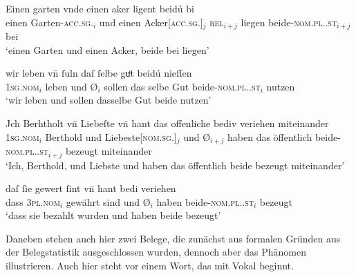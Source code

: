 \begin{exe}
\ex \label{ex:vvfinctrl}
	\begin{xlist}
	\ex \label{ex:vvfinctrl_1}
		\gll Einen garten vnde einen aker {} ligent
			beidú bi \textelp{} \\			
			einen Garten-\textsc{acc.sg.\MascI}$_i$ und einen
				Acker[\textsc{acc.sg.\MascI}]$_j$ \textsc{rel}$_{i+j}$ liegen
				beide-\textsc{nom.pl.\NeutI.st}$_{i+j}$ bei {} \\
		\trans `einen Garten und einen Acker,  beide bei
			\textelp{} liegen'
			\parencites(Nr.~3249, Freiburg i.\,Br., 1299)[417,4--5]{cao4}

	\ex \label{ex:vvfinctrl_2}
		\gll wir leben \textelp{} vn̄ {} ſuln daſ ſelbe guͦt
				beidú nieſſen \\				
			\textsc{1sg\subMF.nom}$_i$ leben {} und Ø$_i$ sollen das selbe Gut
				beide-\textsc{nom.pl.\NeutMF.st}$_i$ nutzen \\
		\trans `wir leben \textelp{} und  sollen
			dasselbe Gut beide nutzen'
			\parencites(Nr.~3376, Neuenburg am Rhein, Kr.~Breisgau-Hochschwarzwald, 1299)[493,21--22]{cao4}

	\ex \label{ex:vvfinctrl_3}
		\gll Jch Berhtholt vn̄ Liebeſte \textelp{} vn̄
				{} hant das offenliche bediv veriehen
				miteinander \\				
			\textsc{1sg\subM.nom}$_i$ Berthold und Liebeste[\textsc{nom.sg.\FemF}]$_j$ {}
				und Ø$_{i+j}$ haben das öffentlich
				beide-\textsc{nom.pl.\NeutMF.st}$_{i+j}$ bezeugt miteinander \\
		\trans `Ich, Berthold, und Liebste \textelp{} und 
			haben das öffentlich beide bezeugt miteinander'
			\parencites(Nr.~N~150, Kl.~Niedermünster, Dépt.~Bas-Rhin, 1277)[108,31--32]{cao5}

	\ex \label{ex:vvfinctrl_4}
		\gll daſ ſie gewert ſint \textelp{} vn̄ {} hant
				bedi veriehen \\				
			dass \textsc{3pl\subMF.nom}$_i$ gewährt sind {} und Ø$_i$ haben
				beide-\textsc{nom.pl.\NeutMF.st}$_i$ bezeugt \\
		\trans `dass sie bezahlt wurden \textelp{} und  haben
			beide bezeugt'
			\parencites(Nr.~N~202, Straßburg, 1281)[156,16]{cao5}
	\end{xlist}
\end{exe}

Daneben stehen auch hier zwei Belege, die zunächst aus formalen Gründen aus der
Beleg\-statistik ausgeschlossen wurden, dennoch aber das Phänomen illustrieren.
Auch hier steht  vor einem Wort, das mit Vokal beginnt.

